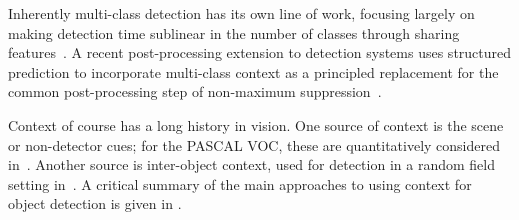 Inherently multi-class detection has its own line of work, focusing largely on making detection time sublinear in the number of classes through sharing features~\cite{Torralba2007,Fan2005,Razavi2011}.
A recent post-processing extension to detection systems uses structured prediction to incorporate multi-class context as a principled replacement for the common post-processing step of non-maximum suppression~\cite{Desai2009}.

Context of course has a long history in vision.
One source of context is the scene or non-detector cues; for the PASCAL VOC, these are quantitatively considered in~\cite{Divvala2009}.
Another source is inter-object context, used for detection in a random field setting in~\cite{Torralba2004}.
A critical summary of the main approaches to using context for object detection is given in \cite{Galleguillos2010}.
